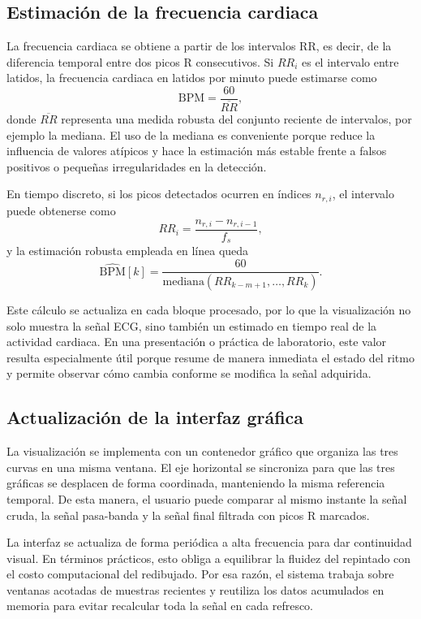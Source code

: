 \subsection{Estimación de la frecuencia cardiaca}

La frecuencia cardiaca se obtiene a partir de los intervalos RR, es decir, de la diferencia temporal entre dos picos R consecutivos. Si $RR_i$ es el intervalo entre latidos, la frecuencia cardiaca en latidos por minuto puede estimarse como
\[
\mathrm{BPM} = \frac{60}{\overline{RR}},
\]
donde $\overline{RR}$ representa una medida robusta del conjunto reciente de intervalos, por ejemplo la mediana. El uso de la mediana es conveniente porque reduce la influencia de valores atípicos y hace la estimación más estable frente a falsos positivos o pequeñas irregularidades en la detección.

En tiempo discreto, si los picos detectados ocurren en índices $n_{r,i}$, el intervalo puede obtenerse como
\[
RR_i=\frac{n_{r,i}-n_{r,i-1}}{f_s},
\]
y la estimación robusta empleada en línea queda
\[
\widehat{\mathrm{BPM}}[k]=\frac{60}{\mathrm{mediana}\left( RR_{k-m+1},\ldots,RR_k\right)}.
\]

Este cálculo se actualiza en cada bloque procesado, por lo que la visualización no solo muestra la señal ECG, sino también un estimado en tiempo real de la actividad cardiaca. En una presentación o práctica de laboratorio, este valor resulta especialmente útil porque resume de manera inmediata el estado del ritmo y permite observar cómo cambia conforme se modifica la señal adquirida.

\subsection{Actualización de la interfaz gráfica}

La visualización se implementa con un contenedor gráfico que organiza las tres curvas en una misma ventana. El eje horizontal se sincroniza para que las tres gráficas se desplacen de forma coordinada, manteniendo la misma referencia temporal. De esta manera, el usuario puede comparar al mismo instante la señal cruda, la señal pasa-banda y la señal final filtrada con picos R marcados.

La interfaz se actualiza de forma periódica a alta frecuencia para dar continuidad visual. En términos prácticos, esto obliga a equilibrar la fluidez del repintado con el costo computacional del redibujado. Por esa razón, el sistema trabaja sobre ventanas acotadas de muestras recientes y reutiliza los datos acumulados en memoria para evitar recalcular toda la señal en cada refresco.

